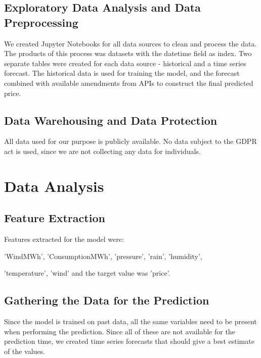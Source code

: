 \documentclass{article}
\begin{document}
\subsection{Exploratory Data Analysis and Data Preprocessing}
\label{subsection:eda}

We created Jupyter Notebooks for all data sources to clean and process the data. The products of this process was datasets with the datetime field as index. Two separate tables were created for each data source - historical and a time series forecast. The historical data is used for training the model, and the forecast combined with available amendments from APIs to construct the final predicted price.

\subsection{Data Warehousing and Data Protection}
\label{subsection:wareousing}

All data used for our purpose is publicly available. No data subject to the GDPR act is used, since we are not collecting any data for individuals.

\section{Data Analysis}
\label{section:analysis}

\subsection{Feature Extraction}
\label{subsection:extraction}

Features extracted for the model were:

'WindMWh', 'ConsumptionMWh', 'pressure', 'rain', 'humidity',

'temperature', 'wind' and the target value was 'price'.


\subsection{Gathering the Data for the Prediction}
\label{subsection:datafilling}

Since the model is trained on past data, all the same variables need to be present when performing the prediction. Since all of these are not available for the prediction time, we created time series forecasts that should give a best estimate of the values.
\end{document}
